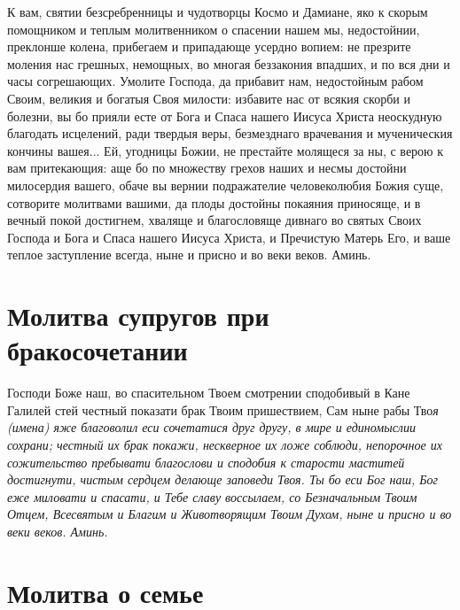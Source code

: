К вам, святии безсребренницы и чудотворцы Космо и Дамиане, яко к скорым помощником и теплым молитвенником о спасении нашем мы, недостойнии, преклонше колена, прибегаем и припадающе усердно вопием: не презрите моления нас грешных, немощных, во многая беззакония впадших, и по вся дни и часы согрешающих. Умолите Господа, да прибавит нам, недостойным рабом Своим, великия и богатыя Своя милости: избавите нас от всякия скорби и болезни, вы бо прияли есте от Бога и Спаса нашего Иисуса Христа неоскудную благодать исцелений, ради твердыя веры, безмезднаго врачевания и мученическия кончины вашея... Ей, угодницы Божии, не престайте молящеся за ны, с верою к вам притекающия: аще бо по множеству грехов наших и несмы достойни милосердия вашего, обаче вы вернии подражателие человеколюбия Божия суще, сотворите молитвами вашими, да плоды достойны покаяния приносяще, и в вечный покой достигнем, хваляще и благословяще дивнаго во святых Своих Господа и Бога и Спаса нашего Иисуса Христа, и Пречистую Матерь Его, и ваше теплое заступление всегда, ныне и присно и во веки веков. Аминь. 

 



\section{Молитва супругов при бракосочетании}
 

Господи Боже наш, во спасительном Твоем смотрении сподобивый в Кане Галилей стей честный показати брак Твоим пришествием, Сам ныне рабы Тво\itshape я (имен\normalfont{}а) яже благоволил еси сочетатися друг другу, в мире и единомыслии сохрани; честный их брак покажи, нескверное их ложе соблюди, непорочное их сожительство пребывати благослови и сподобия к старости маститей достигнути, чистым сердцем делающе заповеди Твоя. Ты бо еси Бог наш, Бог еже миловати и спасати, и Тебе славу воссылаем, со Безначальным Твоим Отцем, Всесвятым и Благим и Животворящим Твоим Духом, ныне и присно и во веки веков. Аминь. 





\section{Молитва о семье}
 

